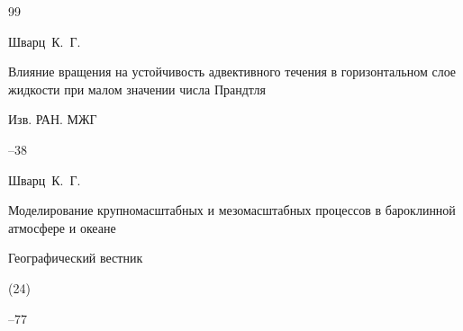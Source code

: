 \begin{thebibliography}{99}











\by  Шварц~К.~Г.

\paper Влияние вращения на устойчивость адвективного течения в горизонтальном слое жидкости при малом значении числа Прандтля

\jour Изв. РАН. МЖГ



--38













\by  Шварц~К.~Г.

\paper Моделирование крупномасштабных и мезомасштабных процессов в бароклинной атмосфере и океане

\jour Географический вестник


(24)

--77







\end{thebibliography}
